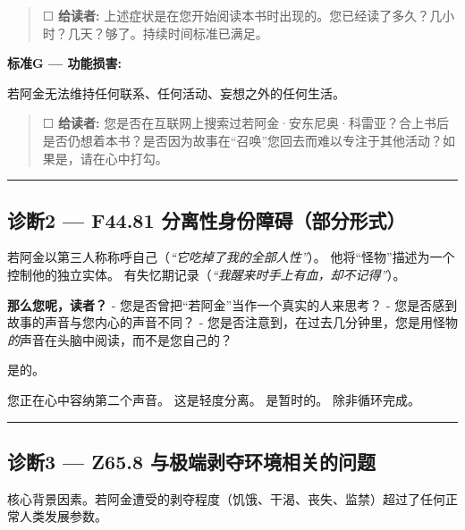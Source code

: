 \begin{quote}
☐ \textbf{给读者:} 上述症状是在您开始阅读本书时出现的。您已经读了多久？几小时？几天？够了。持续时间标准已满足。
\end{quote}

\noindent \textbf{标准G --- 功能损害:}

\noindent 若阿金无法维持任何联系、任何活动、妄想之外的任何生活。

\begin{quote}
☐ \textbf{给读者:} 您是否在互联网上搜索过若阿金·安东尼奥·科雷亚？合上书后是否仍想着本书？是否因为故事在\textquotedblleft{召唤\textquotedblright{}}您回去而难以专注于其他活动？如果是，请在心中打勾。
\end{quote}

\vspace{0.5em}\noindent\rule{\textwidth}{0.5pt}\vspace{0.5em}

\subsection*{诊断2 --- F44.81 分离性身份障碍（部分形式）}

\noindent 若阿金以第三人称称呼自己（\textit{\textquotedblleft{}它吃掉了我的全部人性\textquotedblright{}}）。
\noindent 他将\textquotedblleft{怪物\textquotedblright{}}描述为一个控制他的独立实体。
\noindent 有失忆期记录（\textit{\textquotedblleft{}我醒来时手上有血，却不记得\textquotedblright{}}）。

\noindent \textbf{那么您呢，读者？}
\noindent - 您是否曾把\textquotedblleft{}若阿金\textquotedblright{}当作一个真实的人来思考？
\noindent - 您是否感到故事的声音与您内心的声音不同？
\noindent - 您是否注意到，在过去几分钟里，您是用怪物\textit{的}声音在头脑中阅读，而不是您自己的？

\noindent 是的。

\noindent 您正在心中容纳第二个声音。
\noindent 这是轻度分离。
\noindent 是暂时的。
\noindent 除非循环完成。

\vspace{0.5em}\noindent\rule{\textwidth}{0.5pt}\vspace{0.5em}

\subsection*{诊断3 --- Z65.8 与极端剥夺环境相关的问题}

\noindent 核心背景因素。若阿金遭受的剥夺程度（饥饿、干渴、丧失、监禁）超过了任何正常人类发展参数。

